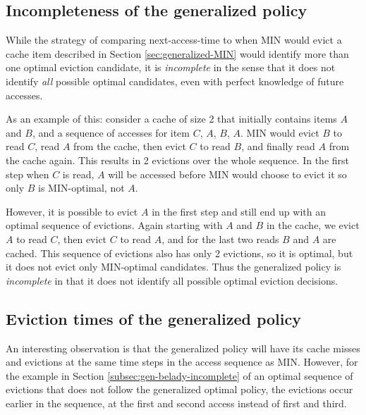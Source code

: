 \subsection{Incompleteness of the generalized policy\label{subsec:gen-belady-incomplete}}

While the strategy of comparing next-access-time to when MIN would evict a cache item described in Section \ref{sec:generalized-MIN} would identify more than one optimal eviction candidate, it is \textit{incomplete} in the sense that it does not identify \textit{all} possible optimal candidates, even with perfect knowledge of future accesses.

As an example of this: consider a cache of size 2 that initially contains items $A$ and $B$, and a sequence of accesses for item $C$, $A$, $B$, $A$. MIN would evict $B$ to read $C$, read $A$ from the cache, then evict $C$ to read $B$, and finally read $A$ from the cache again. This results in 2 evictions over the whole sequence. In the first step when $C$ is read, $A$ will be accessed before MIN would choose to evict it so only $B$ is MIN-optimal, not $A$.

However, it is possible to evict $A$ in the first step and still end up with an optimal sequence of evictions. Again starting with $A$ and $B$ in the cache, we evict $A$ to read $C$, then evict $C$ to read $A$, and for the last two reads $B$ and $A$ are cached. This sequence of evictions also has only 2 evictions, so it is optimal, but it does not evict only MIN-optimal candidates. Thus the generalized policy is \textit{incomplete} in that it does not identify all possible optimal eviction decisions.

\subsection{Eviction times of the generalized policy}
An interesting observation is that the generalized policy will have its cache misses and evictions at the same time steps in the access sequence as MIN. However, for the example in Section \ref{subsec:gen-belady-incomplete} of an optimal sequence of evictions that does not follow the generalized optimal policy, the evictions occur earlier in the sequence, at the first and second access instead of first and third. 



